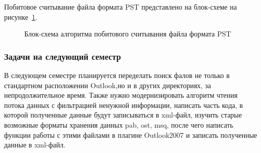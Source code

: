 Побитовое считывание файла формата PST представлено на блок-схеме на рисунке~\ref{pst_reading:pst_reading}.

\begin{figure}[ht]                                                %
\caption{Блок-схема алгоритма побитового считывания файла формата PST}
\label{pst_reading:pst_reading}
\end{figure}


\subsubsection{Задачи на следующий семестр}
В следующем семестре планируется переделать поиск фалов не только в стандартном расположении Outlook,но и в других директориях, за непродолжительное время. Также нужно модернизировать алгоритм чтения потока данных с фильтрацией ненужной информации, написать часть кода, в которой полученные данные будут записываться в xml-файл, изучить старые  возможные форматы хранения данных  pab, ost, msq, после чего написать функции работы с этими файлами в плагине Outlook2007 и записать  полученные данные в xml-файл. 

\clearpage
